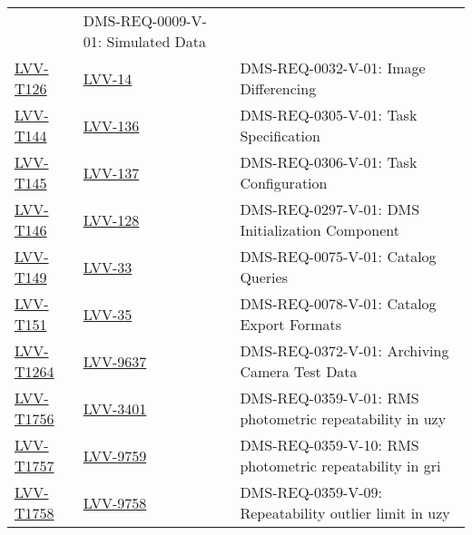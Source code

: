 \begin{longtable}{p{3cm}p{3cm}L{9cm}}
  & DMS-REQ-0009-V-01: Simulated Data
 \\ 
\hline
\href{https://jira.lsstcorp.org/secure/Tests.jspa#/testCase/LVV-T126}{LVV-T126} &
  \href{https://jira.lsstcorp.org/browse/LVV-14}{LVV-14}
  & DMS-REQ-0032-V-01: Image Differencing
 \\ 
\hline
\href{https://jira.lsstcorp.org/secure/Tests.jspa#/testCase/LVV-T144}{LVV-T144} &
  \href{https://jira.lsstcorp.org/browse/LVV-136}{LVV-136}
  & DMS-REQ-0305-V-01: Task Specification
 \\ 
\hline
\href{https://jira.lsstcorp.org/secure/Tests.jspa#/testCase/LVV-T145}{LVV-T145} &
  \href{https://jira.lsstcorp.org/browse/LVV-137}{LVV-137}
  & DMS-REQ-0306-V-01: Task Configuration
 \\ 
\hline
\href{https://jira.lsstcorp.org/secure/Tests.jspa#/testCase/LVV-T146}{LVV-T146} &
  \href{https://jira.lsstcorp.org/browse/LVV-128}{LVV-128}
  & DMS-REQ-0297-V-01: DMS Initialization Component
 \\ 
\hline
\href{https://jira.lsstcorp.org/secure/Tests.jspa#/testCase/LVV-T149}{LVV-T149} &
  \href{https://jira.lsstcorp.org/browse/LVV-33}{LVV-33}
  & DMS-REQ-0075-V-01: Catalog Queries
 \\ 
\hline
\href{https://jira.lsstcorp.org/secure/Tests.jspa#/testCase/LVV-T151}{LVV-T151} &
  \href{https://jira.lsstcorp.org/browse/LVV-35}{LVV-35}
  & DMS-REQ-0078-V-01: Catalog Export Formats
 \\ 
\hline
\href{https://jira.lsstcorp.org/secure/Tests.jspa#/testCase/LVV-T1264}{LVV-T1264} &
  \href{https://jira.lsstcorp.org/browse/LVV-9637}{LVV-9637}
  & DMS-REQ-0372-V-01: Archiving Camera Test Data
 \\ 
\hline
\href{https://jira.lsstcorp.org/secure/Tests.jspa#/testCase/LVV-T1756}{LVV-T1756} &
  \href{https://jira.lsstcorp.org/browse/LVV-3401}{LVV-3401}
  & DMS-REQ-0359-V-01: RMS photometric repeatability in uzy
 \\ 
\hline
\href{https://jira.lsstcorp.org/secure/Tests.jspa#/testCase/LVV-T1757}{LVV-T1757} &
  \href{https://jira.lsstcorp.org/browse/LVV-9759}{LVV-9759}
  & DMS-REQ-0359-V-10: RMS photometric repeatability in gri
 \\ 
\hline
\href{https://jira.lsstcorp.org/secure/Tests.jspa#/testCase/LVV-T1758}{LVV-T1758} &
  \href{https://jira.lsstcorp.org/browse/LVV-9758}{LVV-9758}
  & DMS-REQ-0359-V-09: Repeatability outlier limit in uzy

\end{longtable}
